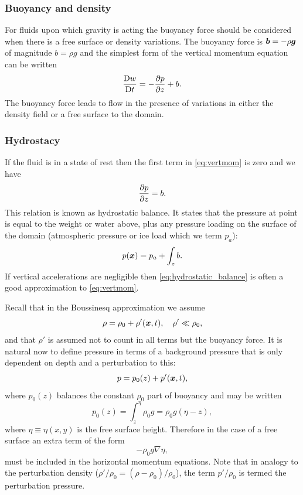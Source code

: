 \subsubsection{Buoyancy and density}\label{sect:buoyancy}
For fluids upon which gravity is acting the buoyancy force should be considered
when there is a free surface or density variations. The buoyancy force is $\vec{b}=-\rho\bmg$
of magnitude $b=\rho g$ and the simplest form of the vertical momentum equation can be written
\begin{equation}\label{eq:vertmom}
\DDt[t]{w} = -\ppx[z]{p} + b.
\end{equation}
The buoyancy force leads to flow in the presence of variations in either the density field or
a free surface to the domain.

\subsubsection{Hydrostacy}
If the fluid is in a state of rest then the first term in \eqref{eq:vertmom} is zero and
we have 
\begin{equation}\label{eq:hydrostatic_balance}
\ppx[z]{p} = b.
\end{equation}
This relation is known as hydrostatic balance. It states that the pressure at point
is equal to the weight or water above, plus any pressure loading on the surface of the
domain (\eg atmospheric pressure or ice load which we term $p_a$):
\begin{equation*}
p(\bmx) = p_a + \int_z b.
\end{equation*}
If vertical accelerations are negligible then \eqref{eq:hydrostatic_balance} is
often a good approximation to \eqref{eq:vertmom}.

Recall that in the Boussinesq approximation we assume 
\begin{equation*}
\rho = \rho_0 + \rho'(\bmx,t),\quad \rho'\ll\rho_0,
\end{equation*}
and that $\rho'$ is assumed not to count in all terms but the buoyancy force. 
It is natural now to define pressure in terms of a background pressure that is
only dependent on depth and a perturbation to this:
\begin{equation*}
p=p_0(z)+p'(\bmx,t),
\end{equation*}
where $p_0(z)$ balances the constant $\rho_0$ part of buoyancy and may be written
\begin{equation*}
p_0(z) = \int_z^\eta \rho_0 g = \rho_0 g(\eta - z),
\end{equation*}
where $\eta\equiv\eta(x,y)$ is the free surface height. Therefore in
the case of a free surface an extra term of the form
\begin{equation*}
-\rho_0g\nabla\eta,
\end{equation*}
must be included in the horizontal momentum equations. 
Note that in analogy to the perturbation density ($\rho'/\rho_0 = (\rho-\rho_0)/\rho_0$), the
term $p'/\rho_0$ is termed the perturbation pressure.

